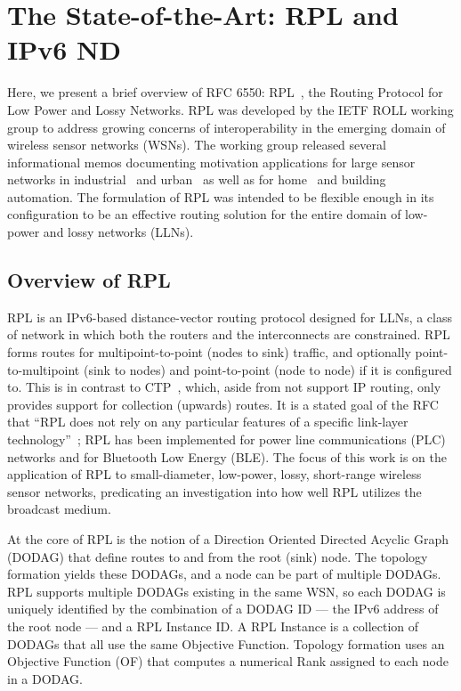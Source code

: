 \section{The State-of-the-Art: RPL and IPv6 ND}

Here, we present a brief overview of RFC 6550: RPL~\cite{rfc6550}, the Routing Protocol for Low Power and Lossy Networks.
RPL was developed by the IETF ROLL working group to address growing concerns of interoperability in the emerging domain of wireless sensor networks (WSNs).
The working group released several informational memos documenting motivation applications for large sensor networks in industrial~\cite{rfc5673} and urban~\cite{rfc5548} as well as for home~\cite{rfc5826} and building~\cite{rfc5867} automation.
The formulation of RPL was intended to be flexible enough in its configuration to be an effective routing solution for the entire domain of low-power and lossy networks (LLNs).

\subsection{Overview of RPL}

RPL is an IPv6-based distance-vector routing protocol designed for LLNs, a class of network in which both the routers and the interconnects are constrained.
RPL forms routes for multipoint-to-point (nodes to sink) traffic, and optionally point-to-multipoint (sink to nodes) and point-to-point (node to node) if it is configured to.
This is in contrast to CTP~\cite{ctp}, which, aside from not support IP routing, only provides support for collection (upwards) routes.
It is a stated goal of the RFC that ``RPL does not rely on any particular features of a specific link-layer technology''~\cite{rfc6550}; RPL has been implemented for power line communications (PLC) networks and for Bluetooth Low Energy (BLE).
The focus of this work is on the application of RPL to small-diameter, low-power, lossy, short-range wireless sensor networks, predicating an investigation into how well RPL utilizes the broadcast medium.

At the core of RPL is the notion of a Direction Oriented Directed Acyclic Graph (DODAG) that define routes to and from the root (sink) node.
The topology formation yields these DODAGs, and a node can be part of multiple DODAGs.
RPL supports multiple DODAGs existing in the same WSN, so each DODAG is uniquely identified by the combination of a DODAG ID --- the IPv6 address of the root node --- and a RPL Instance ID.
A RPL Instance is a collection of DODAGs that all use the same Objective Function.
Topology formation uses an Objective Function (OF) that computes a numerical Rank assigned to each node in a DODAG.

